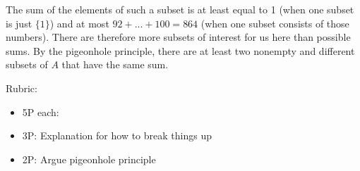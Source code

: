 \documentclass{article}
\theoremstyle{definition}
\begin{document}
\begin{solution}
\begin{enumerate}
	 The sum of the elements of such a subset is at least equal to 1 (when one subset is just $\{1\}$) and at most $ 92 + ... + 100 = 864$ (when one subset consists of those numbers). There are therefore more subsets of interest for us here than possible sums. By the pigeonhole principle, there are at least two nonempty and different subsets of $A$ that have the same sum.
	 
\end{enumerate}

{\color{red} Rubric:
\begin{itemize}
\item 5P each:
\item 3P: Explanation for how to break things up
\item 2P: Argue pigeonhole principle
\end{itemize}}
\end{solution}
\end{document}
